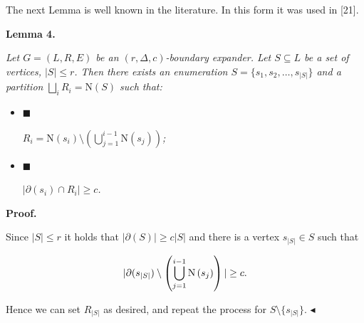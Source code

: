 \documentclass[10pt,a4paper]{article}
\begin{document}
The next Lemma is well known in the literature. In this form it was used in [21].\par





\par\medskip\noindent\textbf{
\textbf{Lemma 4}\textbf{.}
}\par



\emph{Let $G=(L,R,E)$ be an $(r,\Delta,c)$-boundary expander. Let $S\subseteq L$ be a set of
vertices, $|S|\leq r$. Then there exists an enumeration $S=\{s_{1},s_{2},\dots,s_{|S|}\}$ and a
partition $\bigsqcup\limits_{i}R_{i}=\mathrm{N}\left(S\right)$ such that:}\par


\begin{itemize}


\item[] 
$\blacksquare$ 


$R_{i}=\mathrm{N}\left(s_{i}\right)\setminus\left(\bigcup\limits_{j=1}^{i-1}%
\mathrm{N}\left(s_{j}\right)\right)$\emph{;}\par





\item[] 
$\blacksquare$ 


$|\partial(s_{i})\cap R_{i}|\geq c$\emph{.}\par





\end{itemize}






\par\medskip\noindent\textbf{Proof.}\par




Since $|S|\leq r$ it holds that $|\partial(S)|\geq c|S|$ and there is a vertex $s_{|S|}\in S$ such
that\par


\[\begin{gathered}
|\partial(s_{|S|})\setminus\left(\bigcup\limits_{j=1}^{i-1}\mathrm{N}\left(s_{%
j}\right)\right)|\geq c.
\end{gathered}\]


Hence we can set $R_{|S|}$ as desired, and repeat the process for $S\setminus\{s_{|S|}\}$.
$\blacktriangleleft$\par
\end{document}
